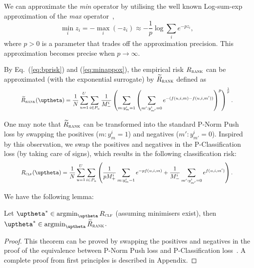 We can approximate the \emph{min} operator by utilising the well known Log-sum-exp approximation 
of the \emph{max} operator~\cite[p. 72]{boyd2004convex},
\begin{equation}
\label{eq:minappox}
\min_i z_i = -\max_i (-z_i) \approx -\frac{1}{p} \log \sum_i e^{-p z_i},
\end{equation}
where $p > 0$ is a parameter that trades off the approximation precision.
This approximation becomes precise when $p \to \infty$.

By Eq.~(\ref{eq:bprisk}) and (\ref{eq:minappox}), the empirical risk $R_\textsc{rank}$ can be approximated
(with the exponential surrogate) by $\widetilde R_\textsc{rank}$ defined as
\begin{equation}
\label{eq:rankapprox}
\resizebox{.9\linewidth}{!}{$
\begin{aligned}
\widetilde R_\textsc{rank}(\uptheta)
= \frac{1}{N} \sum_{u=1}^U \sum_{i \in P_u} \frac{1}{M_-^i} \left( \sum_{m: y_m^i = 1} \left( \sum_{m': y_{m'}^i = 0} 
  e^{-(f(u, i, m) - f(u, i, m'))} \right)^p \right)^\frac{1}{p}.
\end{aligned}
$}
\end{equation}


One may note that $\widetilde R_\textsc{rank}$ can be transformed into the standard P-Norm Push loss by swapping the
positives ($m: y_m^i = 1$) and negatives ($m': y_{m'}^i = 0$). %
Inspired by this observation, we swap the positives and negatives in the P-Classification loss (by taking care of signs),
which results in the following classification risk:
\begin{equation}
\label{eq:clfrisk}
\resizebox{.9\linewidth}{!}{$\displaystyle
R_\textsc{clf}(\uptheta)
= \frac{1}{N} \sum_{u=1}^U \sum_{i \in P_u} \left(
  \frac{1}{p M_+^i} \sum_{m: y_m^i = 1} e^{-p f(u, i, m)}
  + \frac{1}{M_-^i} \sum_{m': y_{m'}^i = 0} e^{f(u, i, m')} \right).
$}
\end{equation}

We have the following lemma:
\begin{lemma}
\label{lm:rank2clf}
Let $\uptheta^* \in \argmin_{\uptheta} R_\textsc{clf}$ (assuming minimisers exist),
then $\uptheta^* \in \argmin_{\uptheta} \widetilde R_\textsc{rank}$.
\end{lemma}

\begin{proof}
This theorem can be proved by swapping the positives and negatives in the proof of 
the equivalence between P-Norm Push loss and P-Classification loss~\cite{ertekin2011equivalence}.
A complete proof from first principles is described in Appendix.
\end{proof}

